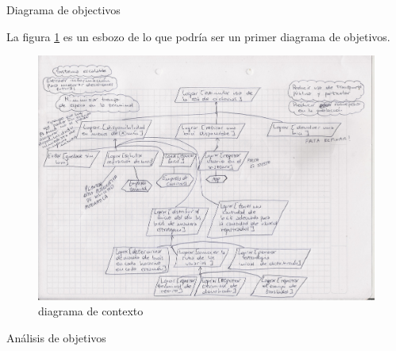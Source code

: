\begin{subsection}{Diagrama de objectivos}

La figura \ref{fig:diagrama_objetivos} es un esbozo de lo que podría ser un primer diagrama de objetivos.

\begin{figure}[!ht]
\begin{center}
\includegraphics[scale=0.47]{imagenes/diagrama_objetivos.jpeg}
\caption{diagrama de contexto}
\label{fig:diagrama_objetivos}
\end{center}
\end{figure}

\end{subsection}

\begin{subsection}{Análisis de objetivos}

\end{subsection}